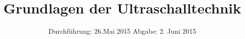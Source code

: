 
\subject{Anfängerpraktikum US1}
\title{Grundlagen der Ultraschalltechnik}
\date{
  Durchführung: 26.Mai 2015
  \hspace{3em}
  Abgabe: 2. Juni 2015
}


\maketitle
\newpage





\printbibliography

